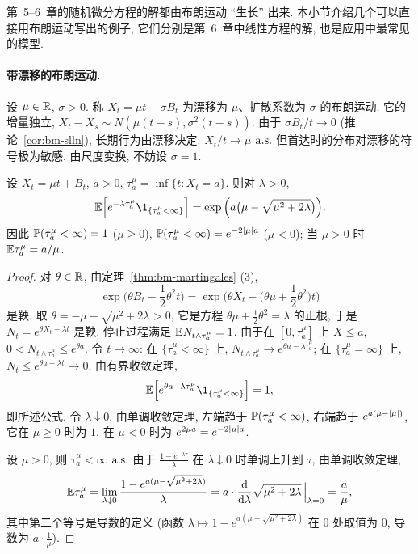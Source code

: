 第~5--6~章的随机微分方程的解都由布朗运动 ``生长'' 出来. 本小节介绍几个可以直接用布朗运动写出的例子, 它们分别是第~6~章中线性方程的解, 也是应用中最常见的模型.

\paragraph{带漂移的布朗运动.} 设 $\mu\in\R$, $\sigma>0$. 称 $X_t=\mu t+\sigma B_t$ 为漂移为 $\mu$、扩散系数为 $\sigma$ 的布朗运动. 它的增量独立, $X_t-X_s\sim N(\mu(t-s),\sigma^2(t-s))$. 由于 $\sigma B_t/t\to0$ (推论~\ref{cor:bm-slln}), 长期行为由漂移决定: $X_t/t\to\mu$ $\as$ 但首达时的分布对漂移的符号极为敏感. 由尺度变换, 不妨设 $\sigma=1$.

\begin{theorem}[带漂移布朗运动的首达时]\label{thm:drift-hitting}
设 $X_t=\mu t+B_t$, $a>0$, $\tau_a^\mu=\inf\{t: X_t=a\}$. 则对 $\lambda>0$,
\[
\E\Big[e^{-\lambda\tau^\mu_a}\1_{\{\tau^\mu_a<\infty\}}\Big]=\exp\Big(a\big(\mu-\sqrt{\mu^2+2\lambda}\big)\Big).
\]
因此 $\P(\tau^\mu_a<\infty)=1$ ($\mu\ge0$), $\P(\tau^\mu_a<\infty)=e^{-2\abs{\mu}a}$ ($\mu<0$); 当 $\mu>0$ 时 $\E\tau_a^\mu=a/\mu$.
\end{theorem}

\begin{proof}
对 $\theta\in\R$, 由定理~\ref{thm:bm-martingales} (3),
\[
\exp\Big(\theta B_t-\frac{1}{2}\theta^2t\Big)=\exp\Big(\theta X_t-\big(\theta\mu+\frac{1}{2}\theta^2\big)t\Big)
\]
是鞅. 取 $\theta=-\mu+\sqrt{\mu^2+2\lambda}>0$, 它是方程 $\theta\mu+\frac{1}{2}\theta^2=\lambda$ 的正根, 于是 $N_t=e^{\theta X_t-\lambda t}$ 是鞅. 停止过程满足 $\E N_{t\wedge\tau^\mu_a}=1$. 由于在 $[0,\tau^\mu_a]$ 上 $X\le a$, $0<N_{t\wedge\tau^\mu_a}\le e^{\theta a}$. 令 $t\to\infty$: 在 $\{\tau^\mu_a<\infty\}$ 上, $N_{t\wedge\tau^\mu_a}\to e^{\theta a-\lambda\tau^\mu_a}$; 在 $\{\tau^\mu_a=\infty\}$ 上, $N_t\le e^{\theta a-\lambda t}\to0$. 由有界收敛定理,
\[
\E\Big[e^{\theta a-\lambda\tau^\mu_a}\1_{\{\tau^\mu_a<\infty\}}\Big]=1,
\]
即所述公式. 令 $\lambda\downarrow0$, 由单调收敛定理, 左端趋于 $\P(\tau^\mu_a<\infty)$, 右端趋于 $e^{a(\mu-\abs{\mu})}$, 它在 $\mu\ge0$ 时为 $1$, 在 $\mu<0$ 时为 $e^{2\mu a}=e^{-2\abs{\mu}a}$.

设 $\mu>0$, 则 $\tau^\mu_a<\infty$ $\as$ 由于 $\frac{1-e^{-\lambda\tau}}{\lambda}$ 在 $\lambda\downarrow0$ 时单调上升到 $\tau$, 由单调收敛定理,
\[
\E\tau^\mu_a=\lim_{\lambda\downarrow0}\frac{1-e^{a(\mu-\sqrt{\mu^2+2\lambda})}}{\lambda}=a\cdot\frac{\dd}{\dd\lambda}\sqrt{\mu^2+2\lambda}\,\Big|_{\lambda=0}=\frac{a}{\mu},
\]
其中第二个等号是导数的定义 (函数 $\lambda\mapsto1-e^{a(\mu-\sqrt{\mu^2+2\lambda})}$ 在 $0$ 处取值为 $0$, 导数为 $a\cdot\frac{1}{\mu}$).
\end{proof}

